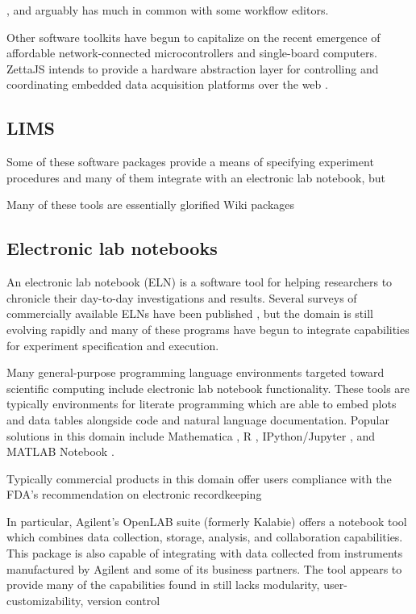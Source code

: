 \documentclass[../thesis]{subfiles}
\begin{document}
, and arguably has much in common
with some workflow editors.

Other software toolkits have begun to capitalize on
the recent emergence of affordable network-connected microcontrollers
and single-board computers.
ZettaJS intends to provide a hardware abstraction layer for
controlling and coordinating embedded data acquisition platforms over
the web \cite{ZettaJS}.


\subsection{LIMS}
Some of these software packages provide a means of specifying
experiment procedures and many of them integrate with an electronic
lab notebook, but

Many of these tools are essentially glorified Wiki packages

\subsection{Electronic lab notebooks}

An electronic lab notebook (ELN) is a software tool for helping
researchers to chronicle their day-to-day investigations and
results. Several surveys of commercially available ELNs have been
published \cite{Rubacha2011, }, but the domain is still evolving
rapidly and many of these programs have begun to integrate
capabilities for experiment specification and execution.

Many general-purpose programming language environments targeted toward
scientific computing include electronic lab notebook functionality.
These tools are typically environments for literate programming
\cite{Knuth:1984:LP:473.479} which are able to embed plots and data
tables alongside code and natural language documentation. Popular
solutions in this domain include Mathematica \cite{mathematica},
R \cite{Rlang}, IPython/Jupyter \cite{IPython}, and
MATLAB Notebook \cite{MATLAB}.

Typically commercial products in this domain offer users compliance
with the FDA's recommendation on electronic recordkeeping \cite{FDA}

In particular, Agilent's OpenLAB suite (formerly Kalabie) offers a
notebook tool which combines data collection, storage, analysis, and
collaboration capabilities. This package is also capable of
integrating with data collected from instruments manufactured by
Agilent and some of its business partners. The tool appears to provide
many of the capabilities found in
 still lacks modularity, user-customizability, version control
\end{document}
